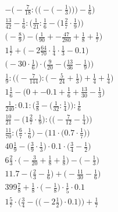 \documentclass[8pt]{article}
\begin{document}
\begin{align}
-\Bigg(-\frac{7}{18} : \bigg(\Big(-\big(-\frac{1}{3}\big)\Big)\bigg) - \frac{1}{6}\Bigg) \\
\frac{13}{42} - \frac{1}{6} : \Big(\frac{1}{21} : \frac{1}{6} - \big(1\frac{2}{7} \cdot \frac{1}{9}\big)\Big) \\
\big(-\frac{8}{9}\big) - \big(\frac{1}{90} + -\frac{47}{280} + \frac{1}{8} + \frac{1}{7}\big) \\
1\frac{1}{7} + \big(-2\frac{64}{70} \cdot \frac{1}{4} \cdot \frac{1}{3} - 0.1\big) \\
\Big(-30 \cdot \frac{1}{6}\Big) \cdot \Big(\frac{9}{20} - \big(\frac{13}{36} - \frac{1}{9}\big)\Big) \\
\frac{1}{9} : \Big(\big(-\frac{7}{144}\big) : \big(-\frac{5}{24} + \frac{1}{3}\big) + \frac{1}{4} + \frac{1}{4}\Big) \\
1\frac{1}{6} - \big(0 + -0.1 + \frac{1}{6} + \frac{13}{30} - \frac{1}{3}\big) \\
\frac{1}{240} : 0.1 : \Big(\frac{3}{8} - \big(\frac{1}{32} : \frac{1}{4}\big)\Big) : \frac{1}{6} \\
\frac{10}{21} - \Big(1\frac{2}{7} \cdot \frac{1}{9}\Big) : \Big(\big(-\frac{7}{12} - \frac{1}{4}\big)\Big) \\
\frac{11}{70} : \Big(\frac{6}{7} \cdot \frac{1}{6}\Big) - \Big(11 \cdot \big(0.7 \cdot \frac{1}{7}\big)\Big) \\
40\frac{1}{9} - \big(\frac{3}{9} \cdot \frac{1}{3}\big) \cdot 0.1 \cdot \big(\frac{3}{4} - \frac{1}{2}\big) \\
6\frac{2}{3} \cdot \big(-\frac{3}{20} + \frac{1}{8} + \frac{1}{8}\big) - \big(-\frac{1}{3}\big) \\
11.7 - \big(\frac{2}{3} - \frac{1}{6}\big) + \big(-\frac{11}{30} - \frac{1}{6}\big) \\
399\frac{7}{8} + \frac{1}{8} \cdot \big(-\frac{1}{8}\big) \cdot \frac{1}{5} \cdot 0.1 \\
1\frac{5}{7} \cdot \bigg(\frac{3}{4} - \Big(\big(-2\frac{1}{2}\big) \cdot 0.1\Big)\bigg) + \frac{1}{7}
\end{align}
\end{document}
